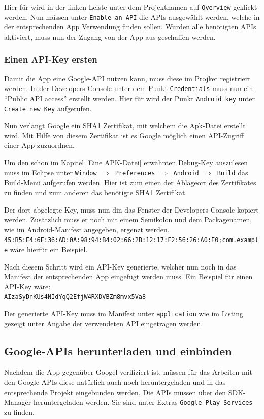 Hier f\"ur wird in der linken Leiste unter dem Projektnamen auf \texttt{Overview} geklickt werden. Nun m\"ussen unter \texttt{Enable an API} die APIs ausgew\"ahlt werden, welche in der entsprechenden App Verwendung finden sollen. Wurden alle ben\"otigten APIs aktiviert, muss nun der Zugang von der App aus geschaffen werden. 

\subsubsection{Einen API-Key ersten}
Damit die App eine Google-API nutzen kann, muss diese im Projket registriert werden. In der Developers Console unter dem Punkt \texttt{Credentials} muss nun ein "`Public API access"' erstellt werden. Hier f\"ur wird der Punkt \texttt{Android key} unter \texttt{Create new Key} aufgerufen. 

Nun verlangt Google ein SHA1 Zertifikat, mit welchem die Apk-Datei erstellt wird. Mit Hilfe von diesem Zertifikat ist es Google m\"oglich einen API-Zugriff einer App zuzuordnen.

Um den schon im Kapitel \ref{Eine APK-Datei} erw\"ahnten Debug-Key auszulesen muss im Eclipse unter \texttt{Window $\Rightarrow$ Preferences $\Rightarrow$ Android $\Rightarrow$ Build} das Build-Men\"u aufgerufen werden. Hier ist zum einen der Ablageort des Zertifikates zu finden und zum anderen das ben\"otigte SHA1 Zertifikat.

Der dort abgelegte Key, muss nun din das Fenster der Developers Console kopiert werden. Zus\"atzlich muss er noch mit einem Semikolon und dem Packagenamen, wie im Android-Manifest angegeben, ergenzt werden. \\\texttt{45:B5:E4:6F:36:AD:0A:98:94:B4:02:66:2B:12:17:F2:56:26:A0:E0;com.example} w\"are hierf\"ur ein Beispiel. 
\cite{GolemHBGoogleServices} \cite{Android44}

Nach diesem Schritt wird ein API-Key generierte, welcher nun noch in das Manifest der entsprechenden App eingef\"ugt werden muss.
Ein Beispiel f\"ur einen API-Key w\"are: \\\texttt{AIzaSyDnKUs4NIdYqQ2EfjW4RXDVBZm8mvx5Va8}

Der generierte API-Key muss im Manifest unter \texttt{application} wie im Listing gezeigt unter Angabe der verwendeten API eingetragen werden. 


\subsection{Google-APIs herunterladen und einbinden}
Nachdem die App gegen\"uber Googel verifiziert ist, m\"ussen f\"ur das Arbeiten mit den Google-APIs diese nat\"urlich auch noch heruntergeladen und in das entsprechende Projekt eingebunden werden. Die APIs m\"ussen \"uber den \ac{SDK}-Manager heruntergeladen werden. Sie sind unter Extras \texttt{Google Play Services} zu finden.

